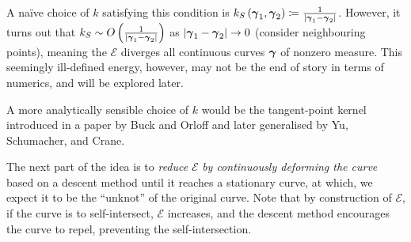 \documentclass[../dissertation.tex]{subfiles}
\begin{document}
A na\"ive choice of $k$ satisfying this condition is $k_S \left( \boldsymbol{\gamma}_1, \boldsymbol{\gamma}_2 \right) \coloneqq \frac{1}{\lvert\boldsymbol{\gamma}_1 - \boldsymbol{\gamma}_2\lvert}$.
However, it turns out that $k_S \sim O\left( \frac{1}{\lvert\boldsymbol{\gamma}_1 - \boldsymbol{\gamma}_2\lvert} \right)$ as $\abs{\gammabf_1 - \gammabf_2} \rightarrow 0$ (consider neighbouring points), meaning the $\mathcal{E}$ diverges all continuous curves $\boldsymbol{\gamma}$ of nonzero measure.
This seemingly ill-defined energy, however, may not be the end of story in terms of numerics, and will be explored later.

A more analytically sensible choice of $k$ would be the tangent-point kernel introduced in a paper by Buck and Orloff\cite{BO1995} and later generalised by Yu, Schumacher, and Crane\cite{YSC2021}.

The next part of the idea is to \emph{reduce} $\mathcal{E}$ \emph{by continuously deforming the curve} based on a descent method until it reaches a stationary curve, at which, we expect it to be the ``unknot'' of the original curve.
Note that by construction of $\mathcal{E}$, if the curve is to self-intersect, $\mathcal{E}$ increases, and the descent method encourages the curve to repel, preventing the self-intersection.
\end{document}
